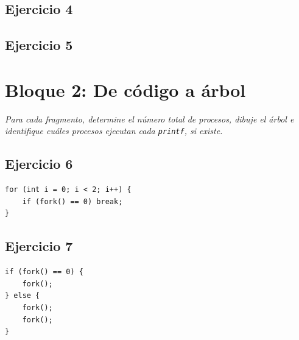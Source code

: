 \documentclass[12pt,a4paper]{article}
\begin{document}
\begin{ejerciciografico}
\subsection*{Ejercicio 4}
\begin{center}
\end{center}
\end{ejerciciografico}
\begin{ejerciciografico}
\subsection*{Ejercicio 5}
\begin{center}
\end{center}
\end{ejerciciografico}
\section*{Bloque 2: De código a árbol}
\textit{Para cada fragmento, determine el número total de procesos, dibuje el árbol e identifique cuáles procesos ejecutan cada \texttt{printf}, si existe.}
\subsection*{Ejercicio 6}
\begin{lstlisting}
for (int i = 0; i < 2; i++) {
    if (fork() == 0) break;
}
\end{lstlisting}
\subsection*{Ejercicio 7}
\begin{lstlisting}
if (fork() == 0) {
    fork();
} else {
    fork();
    fork();
}
\end{lstlisting}
\end{document}
